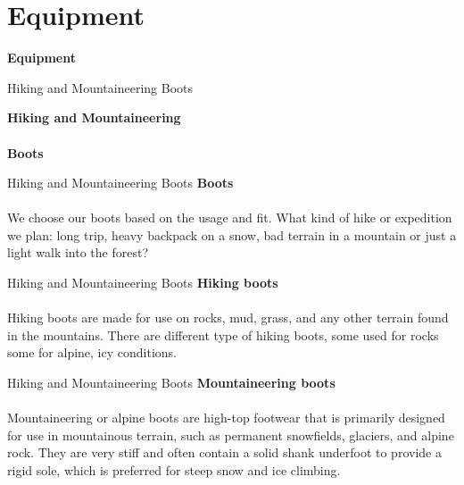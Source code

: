 \documentclass[xcolor=dvipsnames,aspectratio=1610]{beamer}
\begin{document}
\section{Equipment}

\begin{frame}
\begin{center}
\Huge \textbf{Equipment}
\end{center}
\end{frame}



\begin{frame}{Hiking and Mountaineering Boots}{}
\begin{center}
\Huge \textbf{Hiking and Mountaineering}\\~\\
\Huge \textbf{Boots}
\end{center}
\end{frame}


\begin{frame}{Hiking and Mountaineering Boots}{}
\LARGE
\textbf{Boots}\\~\\
\Large
We choose our boots based on the usage and fit. What kind of hike or 
expedition we plan: long trip, heavy backpack on a snow, bad terrain in a 
mountain or just a light walk into the forest?
\end{frame}


\begin{frame}{Hiking and Mountaineering Boots}{}
\LARGE
\textbf{Hiking boots}\\~\\
\Large
Hiking boots are made for use on rocks, mud, grass, and any other 
terrain found in the mountains. There are different type 
of hiking boots, some used for rocks some for alpine, icy 
conditions.
\end{frame}

\begin{frame}{Hiking and Mountaineering Boots}{}
\LARGE
\textbf{Mountaineering boots}\\~\\
\Large
Mountaineering or alpine boots are high-top footwear that is 
primarily designed for use in mountainous terrain, such as permanent
snowfields, glaciers, and alpine rock. They are very stiff and often 
contain a solid shank underfoot to provide a rigid sole, which is 
preferred for steep snow and ice climbing.
\end{frame}
\end{document}
